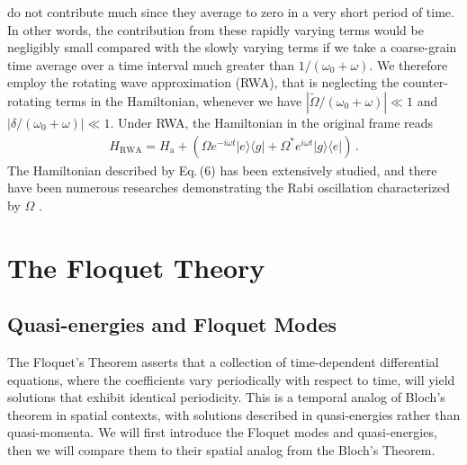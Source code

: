 \documentclass[reprint, amsmath, amssymb, aps]{revtex4-2}
\newcommand{\that}[1]{\widetilde{#1}}
\begin{document}
do not contribute much since they average to zero in a very short period of time. In other words, the contribution from these rapidly varying terms would be negligibly
small compared with the slowly varying terms if we take a coarse-grain time average over a time interval much greater than
$1/(\omega_0 + \omega)$. We therefore employ the rotating wave approximation (RWA), that is neglecting the counter-rotating terms in the Hamiltonian, whenever we have $|\that{\Omega}/(\omega_0+\omega)| \ll 1$ and $|\delta /(\omega_0+\omega)|\ll 1$.
Under RWA, the Hamiltonian in the original frame reads
\begin{align}
H_{\text{RWA}} = H_\text{a} +  \left(\Omega e^{-i\omega t}|e\rangle\langle g| + \Omega^* e^{i\omega t}|g\rangle \langle e|\right)\,.
\end{align}
The Hamiltonian described by Eq.\,(6) has been extensively studied, and there have been numerous researches demonstrating the Rabi oscillation characterized by $\Omega$ \cite{Dudin, Gentile, Shandarova}. 

\section{\label{sec:level1}The Floquet Theory}
\subsection{Quasi-energies and Floquet Modes}
The Floquet's Theorem asserts that a collection of time-dependent differential equations, where the coefficients vary periodically with respect to time, will yield solutions that exhibit identical periodicity. This is a temporal analog of Bloch's theorem in spatial contexts, with solutions described in quasi-energies rather than quasi-momenta. We will first introduce the Floquet modes and quasi-energies, then we will compare them to their spatial analog from the Bloch's Theorem.\\
\end{document}

